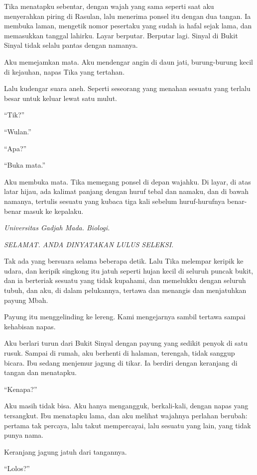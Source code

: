 \documentclass[11pt,twoside,openany]{book}
\makeatletter
\newcommand{\scenebreak}{\par\vspace{0.9em}{\centering\textsc{*\hspace{0.7em}*\hspace{0.7em}*}\par}\vspace{0.9em}\@afterindentfalse\@afterheading}
\makeatother
\begin{document}
Tika menatapku sebentar, dengan wajah yang sama seperti saat aku menyerahkan piring di Rasulan, lalu menerima ponsel itu dengan dua tangan. Ia membuka laman, mengetik nomor pesertaku yang sudah ia hafal sejak lama, dan memasukkan tanggal lahirku. Layar berputar. Berputar lagi. Sinyal di Bukit Sinyal tidak selalu pantas dengan namanya.

Aku memejamkan mata. Aku mendengar angin di daun jati, burung-burung kecil di kejauhan, napas Tika yang tertahan.

Lalu kudengar suara aneh. Seperti seseorang yang menahan sesuatu yang terlalu besar untuk keluar lewat satu mulut.

``Tik?''

``Wulan.''

``Apa?''

``Buka mata.''

Aku membuka mata. Tika memegang ponsel di depan wajahku. Di layar, di atas latar hijau, ada kalimat panjang dengan huruf tebal dan namaku, dan di bawah namanya, tertulis sesuatu yang kubaca tiga kali sebelum huruf-hurufnya benar-benar masuk ke kepalaku.

\emph{Universitas Gadjah Mada. Biologi.}

\emph{SELAMAT. ANDA DINYATAKAN LULUS SELEKSI.}

Tak ada yang bersuara selama beberapa detik. Lalu Tika melempar keripik ke udara, dan keripik singkong itu jatuh seperti hujan kecil di seluruh puncak bukit, dan ia berteriak sesuatu yang tidak kupahami, dan memelukku dengan seluruh tubuh, dan aku, di dalam pelukannya, tertawa dan menangis dan menjatuhkan payung Mbah.

Payung itu menggelinding ke lereng. Kami mengejarnya sambil tertawa sampai kehabisan napas.

\scenebreak
Aku berlari turun dari Bukit Sinyal dengan payung yang sedikit penyok di satu rusuk. Sampai di rumah, aku berhenti di halaman, terengah, tidak sanggup bicara. Ibu sedang menjemur jagung di tikar. Ia berdiri dengan keranjang di tangan dan menatapku.

``Kenapa?''

Aku masih tidak bisa. Aku hanya mengangguk, berkali-kali, dengan napas yang tersangkut. Ibu menatapku lama, dan aku melihat wajahnya perlahan berubah: pertama tak percaya, lalu takut mempercayai, lalu sesuatu yang lain, yang tidak punya nama.

Keranjang jagung jatuh dari tangannya.

``Lolos?''
\end{document}
